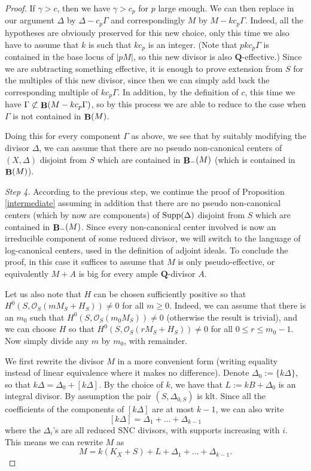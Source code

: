 \documentclass[11pt]{amsart}
\theoremstyle{plain}
\theoremstyle{definition}
\newcommand{\QQ}{\mathbf{Q}}
\newcommand{\OO}{\mathcal  {O}}
\DeclareMathOperator{\BB}{{\bf B}}
\begin{document}
\begin{proof}
If $\gamma > c$, then we have $\gamma > c_p$ for $p$ large enough. We can then replace in our argument $\Delta$ by 
$\Delta - c_p \Gamma$ and correspondingly $M$ by $M - k c_p \Gamma$. Indeed, all the hypotheses are obviously preserved for this new choice, only this time we also have to assume that $k$ is such that $kc_p$ is an integer. (Note that $pk c_p \Gamma$ is contained in the base locus of $|pM|$, so this new divisor 
is also $\QQ$-effective.) Since we are subtracting something effective, it is enough to prove extension from $S$ 
for the multiples of this new divisor, since then we can simply add back the corresponding multiple of $k c_p \Gamma$. 
In addition,  by the definition of $c$, this time we have $\Gamma \not\subset \BB (M - k c_p \Gamma)$, so by this process 
we are able to reduce to the case when $\Gamma$ is not contained in $\BB (M)$.

Doing this for every component $\Gamma$ as above, we see that by suitably modifying the divisor $\Delta$, we can assume that there are no pseudo non-canonical centers of $(X, \Delta)$ disjoint from $S$ which are contained in 
$\BB_{-} (M)$ (which is contained in $\BB (M)$).


\noindent
\emph{Step 4.} According to the previous step, we continue the proof of Proposition \ref{intermediate} assuming in addition that there are no pseudo non-canonical centers (which by now are components) of 
${\rm Supp}(\Delta)$ disjoint from $S$ which are contained in $\BB_{-} (M)$. Since every non-canonical center involved is now an irreducible component of some reduced divisor, we will switch to the language of log-canonical centers, used in the definition of adjoint ideals.
To conclude the proof, in this case it suffices to assume that $M$ is only pseudo-effective, or equivalently $M + A$ is big for every ample $\QQ$-divisor $A$. 

Let us also note that $H$ can be chosen sufficiently positive so that $H^0 (S, \OO_S (mM_S + H_S))\neq 0$ for all $m \ge 0$. Indeed, we can assume that there is an $m_0$ such that $H^0 (S, \OO_S (m_0 M_S))\neq 0$ (otherwise the result 
is trivial), and we can choose $H$ so that $H^0 (S, \OO_S (rM_S + H_S))\neq 0$ for all $0 \le r \le m_0 -1$. Now simply divide any $m$ by $m_0$, with remainder. 

We first rewrite the divisor $M$ in a more convenient form (writing equality instead of linear equivalence where it makes no difference). Denote $\Delta_0 := \{k\Delta\}$, so that $k\Delta = \Delta_0 + [k\Delta]$. By the choice of $k$, we have that $L := kB + \Delta_0$ is an integral divisor. By assumption the pair $(S, \Delta_{0,S})$ is klt. Since  all the coefficients of the components of $[k\Delta]$ are at most $k-1$,  we can also write 
$$[k\Delta] = \Delta_1 + \ldots + \Delta_{k-1}$$ 
where the $\Delta_i$'s are all reduced SNC divisors, with supports increasing with $i$. This means we can rewrite $M$ as 
$$M = k(K_X + S) + L + \Delta_1 + \ldots + \Delta_{k-1}.$$


\end{proof}
\end{document}
